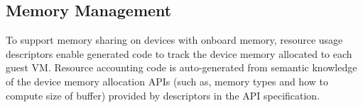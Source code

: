
\subsection{Memory Management}

To support memory sharing on devices with onboard memory, \speclang resource usage descriptors
enable generated code to track the device memory
allocated to each guest VM. %
Resource accounting code is auto-generated from semantic knowledge of
the device memory allocation APIs (such as, memory types and how to compute size
of buffer) provided by descriptors in the API specification.
